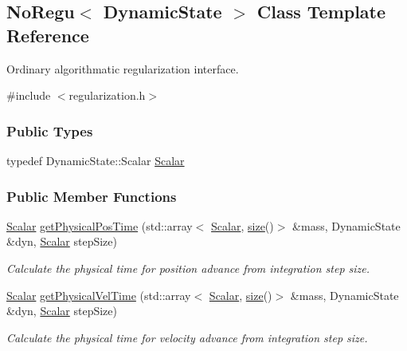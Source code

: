 \hypertarget{class_no_regu}{}\subsection{No\+Regu$<$ Dynamic\+State $>$ Class Template Reference}
\label{class_no_regu}


Ordinary algorithmatic regularization interface.  




{\ttfamily \#include $<$regularization.\+h$>$}

\subsubsection*{Public Types}
\begin{DoxyCompactItemize}
\item 
typedef Dynamic\+State\+::\+Scalar \mbox{\hyperlink{class_no_regu_aa6d40425c316da9c24b55bc908d3cd14}{Scalar}}
\end{DoxyCompactItemize}
\subsubsection*{Public Member Functions}
\begin{DoxyCompactItemize}
\item 
\mbox{\hyperlink{class_no_regu_aa6d40425c316da9c24b55bc908d3cd14}{Scalar}} \mbox{\hyperlink{class_no_regu_a0c365c1758907b76ee8bf5138f3b20be}{get\+Physical\+Pos\+Time}} (std\+::array$<$ \mbox{\hyperlink{class_no_regu_aa6d40425c316da9c24b55bc908d3cd14}{Scalar}}, \mbox{\hyperlink{class_no_regu_ade4184183a8b2c2095831f3a54e1836a}{size}}()$>$ \&mass, Dynamic\+State \&dyn, \mbox{\hyperlink{class_no_regu_aa6d40425c316da9c24b55bc908d3cd14}{Scalar}} step\+Size)
\begin{DoxyCompactList}\small\item\em Calculate the physical time for position advance from integration step size. \end{DoxyCompactList}\item 
\mbox{\hyperlink{class_no_regu_aa6d40425c316da9c24b55bc908d3cd14}{Scalar}} \mbox{\hyperlink{class_no_regu_a3294ff362189dbdcab88a094ada2ce1c}{get\+Physical\+Vel\+Time}} (std\+::array$<$ \mbox{\hyperlink{class_no_regu_aa6d40425c316da9c24b55bc908d3cd14}{Scalar}}, \mbox{\hyperlink{class_no_regu_ade4184183a8b2c2095831f3a54e1836a}{size}}()$>$ \&mass, Dynamic\+State \&dyn, \mbox{\hyperlink{class_no_regu_aa6d40425c316da9c24b55bc908d3cd14}{Scalar}} step\+Size)
\begin{DoxyCompactList}\small\item\em Calculate the physical time for velocity advance from integration step size. \end{DoxyCompactList}\end{DoxyCompactItemize}
